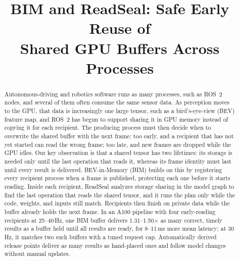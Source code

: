 \documentclass[conference]{IEEEtran}
\newcommand{\ms}{\,ms}
\newcommand{\Hz}{\,Hz}
\begin{document}
\title{BIM and ReadSeal: Safe Early Reuse of\\ Shared GPU Buffers Across Processes}

\author{
}

\maketitle

\begin{abstract}
Autonomous-driving and robotics software runs as many processes, such as ROS~2 nodes, and several of them often consume the same sensor data. As perception moves to the GPU, that data is increasingly one large tensor, such as a bird's-eye-view (BEV) feature map, and ROS~2 has begun to support sharing it in GPU memory instead of copying it for each recipient. The producing process must then decide when to overwrite the shared buffer with the next frame: too early, and a recipient that has not yet started can read the wrong frame; too late, and new frames are dropped while the GPU idles. Our key observation is that a shared tensor has two lifetimes: its storage is needed only until the last operation that reads it, whereas its frame identity must last until every result is delivered. BEV-in-Memory (BIM) builds on this by registering every recipient process when a frame is published, protecting each one before it starts reading. Inside each recipient, ReadSeal analyzes storage sharing in the model graph to find the last operation that reads the shared tensor, and it runs the plan only while the code, weights, and inputs still match. Recipients then finish on private data while the buffer already holds the next frame. In an A100 pipeline with four early-reading recipients at 25--40\Hz, one BIM buffer delivers 1.31--1.50$\times$ as many correct, timely results as a buffer held until all results are ready, for 8--11\ms{} more mean latency; at 30\Hz, it matches two such buffers with a tuned request cap. Automatically derived release points deliver as many results as hand-placed ones and follow model changes without manual updates.
\end{abstract}
\end{document}
